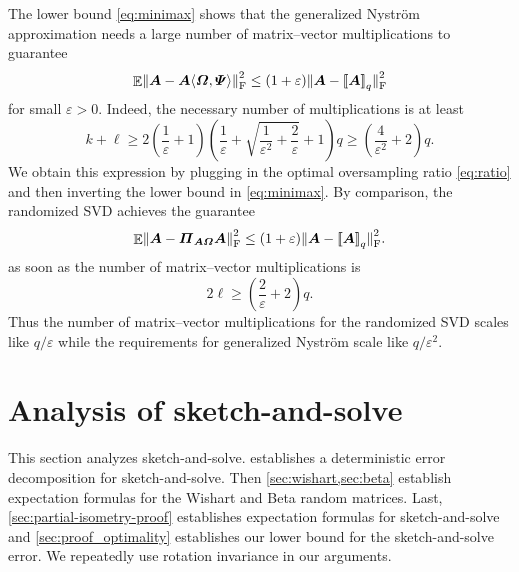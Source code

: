 \documentclass[11pt]{article}
\newcommand{\mat}[1]{\boldsymbol{#1}}
\newcommand{\lowrank}[1]{%
  \mleft[\!\mleft[ #1 \mright]\!\mright]}
\newcommand{\norm}[1]{\mleft\| #1 \mright\|}
\DeclareMathOperator{\expect}{\mathbb{E}}
\theoremstyle{definition}
\numberwithin{equation}{section}
\begin{document}
The lower bound \cref{eq:minimax} shows that the generalized Nystr\"om approximation needs a large number of matrix--vector multiplications to guarantee
%
\begin{equation*}
    \expect \norm{\mat{A} - \mat{A}\langle\mat{\varOmega},\mat{\varPsi}\rangle}_{\rm F}^2
    \leq (1 + \varepsilon) \norm{\smash{\mat{A} - \lowrank{\mat{A}}_q}}_{\rm F}^2
\end{equation*}
%
for small $\varepsilon > 0$.
Indeed, the necessary number of multiplications is at least 
\begin{equation*}
    k + \ell \geq 2 
    \left(\frac{1}{\varepsilon} + 1 \right) 
    \left(\frac{1}{\varepsilon} + \sqrt{\frac{1}{\varepsilon^2} + \frac{2}{\varepsilon}} + 1\right) q 
    \ge \left(\frac{4}{\varepsilon^2} + 2 \right)q.
\end{equation*}
%
We obtain this expression by plugging in the optimal oversampling ratio \cref{eq:ratio} and then inverting the lower bound in \cref{eq:minimax}.
By comparison, the randomized SVD achieves the guarantee
\begin{equation*}
    \expect \norm{\mat{A} - \mat{\varPi}_{\mat{A} \mat{\varOmega}} \mat{A}}_{\rm F}^2
    \leq (1 + \varepsilon) 
    \norm{\smash{\mat{A} - \lowrank{\mat{A}}_q}}_{\rm F}^2.
\end{equation*}
as soon as the number of matrix--vector multiplications is 
\begin{equation*}
2 \ell \geq \left(\frac{2}{\varepsilon} + 2\right)q.
\end{equation*}
%
Thus the number of matrix--vector multiplications for the randomized SVD scales like $q/\varepsilon$ while the requirements for generalized Nystr\"om scale like $q/\varepsilon^2$.

\section{Analysis of sketch-and-solve}
\label{sec:sketch_analysis}

This section analyzes sketch-and-solve.
 establishes a deterministic error decomposition for sketch-and-solve.
Then \cref{sec:wishart,sec:beta} establish expectation formulas for the Wishart and Beta random matrices.
Last, \cref{sec:partial-isometry-proof} establishes expectation formulas for sketch-and-solve and
\cref{sec:proof_optimality} establishes our lower bound for the sketch-and-solve error.
We repeatedly use rotation invariance in our arguments.
\end{document}
